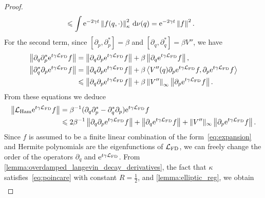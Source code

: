 \documentclass[11pt,a4paper]{article}
\newcommand{\e}{\mathrm{e}}
\newcommand{\commut}[2]{[#1, #2]}
\renewcommand{\d}{\mathrm d}
\theoremstyle{plain}
\numberwithin{equation}{section}
\renewcommand{\leq}{\leqslant}
\begin{document}
\begin{proof}
\begin{align}
        \label{eq:bound_first_term}
        &\leq \int \e^{-2 \gamma t} \norm{f(q, \cdot) }[\kappa]^2 \, \d \nu(q) = \e^{-2\gamma t} \norm{f}^2.
    \end{align}
    For the second term, since $\commut{\partial_p}{\partial_p^*} = \beta$ and $\commut{\partial_q}{\partial_q^*} = \beta V''$,
    we have
    \begin{align*}
        \norm{\partial_q \partial_p^* \e^{t \gamma \mathcal L_{\rm FD}} f}
        &= \norm{\partial_q \partial_p \e^{t \gamma \mathcal L_{\rm FD}} f} + \beta \norm{\partial_q \e^{t \gamma \mathcal L_{\rm FD}} f}, \\
        \norm{\partial_q^* \partial_p \e^{t \gamma \mathcal L_{\rm FD}} f}
        &= \norm{\partial_q \partial_p \e^{t \gamma \mathcal L_{\rm FD}} f}
        + \beta \ip{V''(q) \partial_p \e^{t \gamma \mathcal L_{\rm FD}} f}{\partial_p \e^{t \gamma \mathcal L_{\rm FD}} f} \\
        &\leq \norm{\partial_q \partial_p \e^{t \gamma \mathcal L_{\rm FD}} f}
        + \beta \norm{V''}[\infty] \norm{\partial_p \e^{t \gamma \mathcal L_{\rm FD}} f}.
    \end{align*}
    From these equations we deduce
    \begin{align}
        \notag
        \norm{\mathcal L_{\rm Ham} \e^{t \gamma \mathcal L_{\rm FD}} f}
        &= \beta^{-1} (\partial_q \partial_p^* - \partial_q^* \partial_p) \e^{t \gamma \mathcal L_{\rm FD}} f \\
        \label{eq:reasoning_action_lham}
        &\leq 2 \beta^{-1} \norm{\partial_q \partial_p \e^{t \gamma \mathcal L_{\rm FD}} f}
        + \norm{\partial_q \e^{t \gamma \mathcal L_{\rm FD}} f}
        + \norm*{V''}[\infty] \norm{\partial_p \e^{t \gamma \mathcal L_{\rm FD}} f}.
    \end{align}
    Since $f$ is assumed to be a finite linear combination of the form~\eqref{eq:expansion} and
    Hermite polynomials are the eigenfunctions of $\mathcal L_{\rm FD}$,
    we can freely change the order of the operators $\partial_q$ and $\e^{t \gamma \mathcal L_{\rm FD}}$.
    From \cref{lemma:overdamped_langevin_decay_derivatives}, the fact that $\kappa$ satisfies~\eqref{eq:poincare} with constant $R = \frac{1}{2}$,
    and \cref{lemma:elliptic_reg},
    we obtain
    \begin{align}

\end{align}
\end{proof}
\end{document}
